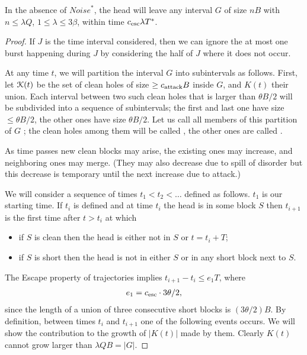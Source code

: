 \documentclass[11pt]{memoir}
\theoremstyle{definition} %
\renewcommand{\le}{\leq}
\renewcommand{\ge}{\geq}
\def\B{B}
\newcommand{\Noise}{\mathit{Noise}}
\newcommand{\Q}{Q}
\newcommand{\Tu}{T}
\newcommand{\Tus}{T^{*}}
\newcommand{\cns}[1]{c_{\textrm{\upshape #1}}}
\newcommand{\CAtt}{\cns{attack}}
\newcommand{\CEsc}{\cns{esc}}
\begin{document}
\begin{lemma}[Escape]\label{lem:escape}
  In the absence of \( \Noise^{*} \), the
  head will leave any interval \( G \) of size \( n\B \) with \(n\le\lambda\Q \),
  \( 1\le\lambda\le 3\beta \), within time \( \CEsc\lambda\Tus \).
\end{lemma}
\begin{proof}
  If \( J \) is the time interval considered, then we can ignore the at most one
  burst happening during \( J \) by considering the half of \( J \) where it does not occur.

  At any time \( t \), we will partition the interval \( G \) into subintervals as follows.
  First, let \( \mathcal{K}(t) \) be the set of clean holes of size \( \ge\CAtt\B \) inside \( G \),
  and \( K(t) \) their union.
  Each interval between two such clean holes that is larger
  than \( \theta\B/2 \) will be subdivided into a sequence of subintervals; the first and last one
  have size \( \le\theta\B/2 \), the other ones have size \( \theta\B/2 \).
  Let us call all members of this partition of \( G \) ;
  the clean holes among them will be called , the other ones are called .

  As time passes new clean blocks may arise, the existing ones may
  increase, and neighboring ones may merge.
  (They may also decrease due to spill of disorder but this decrease is temporary until the next increase
  due to attack.)

  We will consider a sequence of times \( t_{1}<t_{2}<\dots \) defined as follows.
  \( t_{1} \) is our starting time.
  If \( t_{i} \) is defined and at time \( t_{i} \) the head is in some block \( S \)
  then \( t_{i+1} \) is the first time after \( t>t_{i} \) at which 
  \begin{itemize}
  \item if \( S \) is clean then the head is either not in \( S \) or \( t = t_{i}+\Tu \);
  \item if \( S \) is short then the head is not in either \( S \) or in any short block next to \( S \).
  \end{itemize}
  The Escape property of trajectories implies \( t_{i+1}-t_{i}\le e_{1}\Tu \), where
  \begin{align*}
   e_{1}=\CEsc\cdot 3\theta/2,
 \end{align*}
  since the length of a union of three consecutive short blocks is \( (3\theta/2)\B \).
  By definition, between times \( t_{i} \) and \( t_{i+1} \) one of the following events occurs.
  We will show the contribution to the growth of \( |K(t)| \) made by them.
  Clearly \( K(t) \) cannot grow larger than \( \lambda\Q\B=|G| \).
  

\end{proof}
\end{document}
